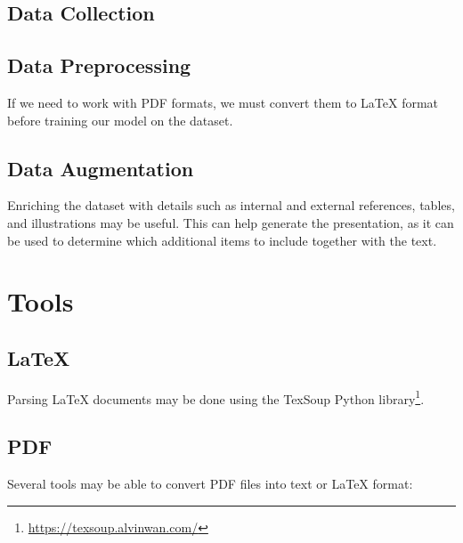 \subsection{Data Collection}

\subsection{Data Preprocessing}
If we need to work with PDF formats, we must convert them to \LaTeX{} format before training our model on the dataset. 

\subsection{Data Augmentation}
Enriching the dataset with details such as internal and external references, tables, and illustrations may be useful. This can help generate the presentation, as it can be used to determine which additional items to include together with the text.

\section{Tools}

\subsection{\LaTeX{}}
Parsing \LaTeX{} documents may be done using the TexSoup Python library\footnote{\url{https://texsoup.alvinwan.com/}}.

\subsection{PDF}
Several tools may be able to convert PDF files into text or \LaTeX{} format: 

